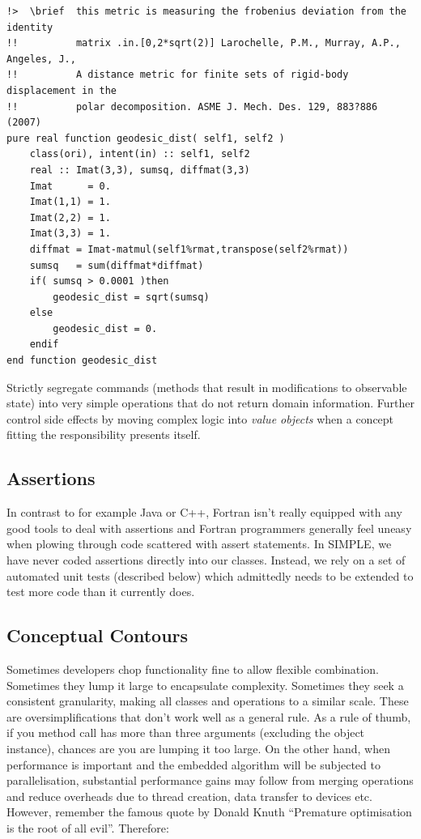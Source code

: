 \documentclass[a4paper,11pt]{article}
\begin{document}
\begin{verbatim}
!>  \brief  this metric is measuring the frobenius deviation from the identity
!!          matrix .in.[0,2*sqrt(2)] Larochelle, P.M., Murray, A.P., Angeles, J., 
!!          A distance metric for finite sets of rigid-body displacement in the 
!!          polar decomposition. ASME J. Mech. Des. 129, 883?886 (2007)
pure real function geodesic_dist( self1, self2 )
    class(ori), intent(in) :: self1, self2
    real :: Imat(3,3), sumsq, diffmat(3,3)
    Imat      = 0.
    Imat(1,1) = 1.
    Imat(2,2) = 1.
    Imat(3,3) = 1.
    diffmat = Imat-matmul(self1%rmat,transpose(self2%rmat))
    sumsq   = sum(diffmat*diffmat)
    if( sumsq > 0.0001 )then
        geodesic_dist = sqrt(sumsq)
    else
        geodesic_dist = 0.
    endif
end function geodesic_dist
\end{verbatim}


Strictly segregate commands (methods that result in modifications to observable state) into very simple operations that do not return domain information. Further control side effects by moving complex logic into \textit{value objects} when a concept fitting the responsibility presents itself.

\subsection{Assertions}
In contrast to for example Java or C++, Fortran isn't really equipped with any good tools to deal with assertions and Fortran programmers generally feel uneasy when plowing through code scattered with assert statements. In SIMPLE, we have never coded assertions directly into our classes. Instead, we rely on a set of automated unit tests (described below) which admittedly needs to be extended to test more code than it currently does. 

\subsection{Conceptual Contours}
Sometimes developers chop functionality fine to allow flexible combination. Sometimes they lump it large to encapsulate complexity. Sometimes they seek a consistent granularity, making all classes and operations to a similar scale. These are oversimplifications that don't work well as a general rule. As a rule of thumb, if you method call has more than three arguments (excluding the object instance), chances are you are lumping it too large. On the other hand, when performance is important and the embedded algorithm will be subjected to parallelisation, substantial performance gains may follow from merging operations and reduce overheads due to thread creation, data transfer to devices etc. However, remember the famous quote by Donald Knuth ``Premature optimisation is the root of all evil''. Therefore:
\end{document}
